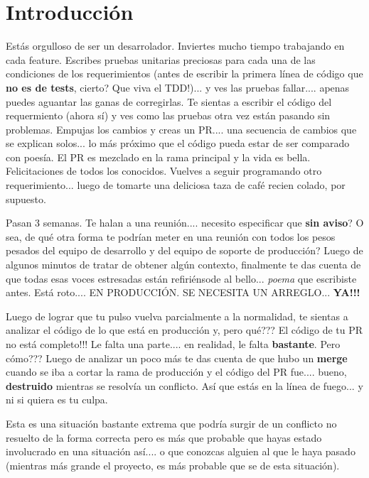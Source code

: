 
\section{Introducción}

Estás orgulloso de ser un desarrolador. Inviertes mucho tiempo trabajando en cada feature. Escribes
pruebas unitarias preciosas para cada una de las condiciones de los requerimientos (antes de escribir
la primera línea de código que {\bf no es de tests}, cierto? Que viva el TDD!)... y ves las pruebas fallar....
apenas puedes aguantar las ganas de corregirlas. Te sientas a escribir el código del requermiento (ahora sí)
y ves como las pruebas otra vez están pasando sin problemas. Empujas los cambios y creas un PR.... una secuencia
de cambios que se explican solos... lo más próximo que el código pueda estar de ser comparado con poesía. El PR
es mezclado en la rama principal y la vida es bella. Felicitaciones de todos los conocidos. Vuelves a seguir
programando otro requerimiento... luego de tomarte una deliciosa taza de café recien colado, por supuesto.

Pasan 3 semanas. Te halan a una reunión.... necesito especificar que {\bf sin aviso}? O sea, de qué otra forma te podrían
meter en una reunión con todos los pesos pesados del equipo de desarrollo y del equipo de soporte de producción?
Luego de algunos minutos de tratar de obtener algún contexto, finalmente te das cuenta de que todas esas voces estresadas
están refiriénsode al bello... {\it poema} que escribiste antes. Está roto.... EN PRODUCCIÓN. SE NECESITA UN ARREGLO...
{\bf YA!!!}

Luego de lograr que tu pulso vuelva parcialmente a la normalidad, te sientas a analizar el código de lo que está en
producción y, pero qué??? El código de tu PR no está completo!!! Le falta una parte.... en realidad, le falta {\bf bastante}.
Pero cómo??? Luego de analizar un poco más te das cuenta de que hubo un {\bf merge} cuando se iba a cortar la rama
de producción y el código del PR fue.... bueno, {\bf destruido} mientras se resolvía un conflicto. Así que estás
en la línea de fuego... y ni si quiera es tu culpa.

Esta es una situación bastante extrema que podría surgir de un conflicto no resuelto de la forma correcta pero es más que
probable que hayas estado involucrado en una situación así.... o que conozcas alguien al que le haya pasado (mientras más
grande el proyecto, es más probable que se de esta situación).

